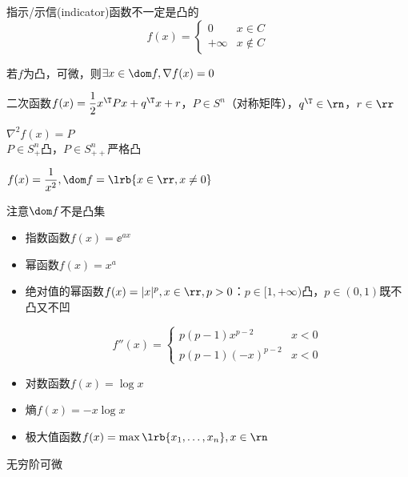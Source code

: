 指示/示信(indicator)函数不一定是凸的
\[f(x)=\begin{cases}0&x\in C\\ +\infty & x\notin C\end{cases}\]

\begin{theorem}
若$f$为凸，可微，则$\exists x\in\dom f,\nabla f(x)=0$
\end{theorem}

\begin{example}
二次函数$f(x)=\dfrac{1}{2}x^\T Px+q^\T x+r$，$P\in S^n$（对称矩阵），$q^\T\in\rn$，$r\in\rr$
\end{example}
\begin{analysis}
$\nabla^2 f(x)=P$\\
$P\in S^n_+$凸，$P\in S_{++}^n$严格凸
\end{analysis}

\begin{example}
$f(x)=\dfrac{1}{x^2},\dom f=\lrb{x\in\rr,x\ne 0}$
\end{example}
\begin{analysis}
注意$\dom f$不是凸集
\end{analysis}
\begin{itemize}
	\item 指数函数$f(x)=\ee^{ax}$
	\item 幂函数$f(x)=x^a$
	\item 绝对值的幂函数$f(x)=|x|^p,x\in\rr,p>0$：$p\in[1,+\infty)$凸，$p\in(0,1)$既不凸又不凹
	\begin{analysis}
	\[f''(x)=\begin{cases}
	p(p-1)x^{p-2} & x<0\\
	p(p-1)(-x)^{p-2} & x<0
	\end{cases}\]
	\end{analysis}
	\item 对数函数$f(x)=\log x$
	\item 熵$f(x)=-x\log x$
	\item 极大值函数$f(x)=\max\lrb{x_1,\ldots,x_n},x\in\rn$
\end{itemize}

\begin{definition}[解析近似]
无穷阶可微
\end{definition}

